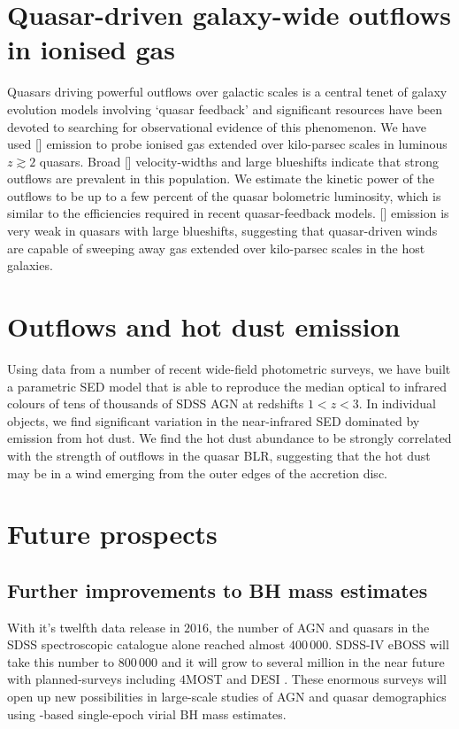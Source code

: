 \section{Quasar-driven galaxy-wide outflows in ionised gas} 

Quasars driving powerful outflows over galactic scales is a central tenet of galaxy evolution models involving `quasar feedback' and significant resources have been devoted to searching for observational evidence of this phenomenon.  
We have used [] emission to probe ionised gas extended over kilo-parsec scales in luminous $z\gtrsim2$ quasars.
Broad [] velocity-widths and large blueshifts indicate that strong outflows are prevalent in this population.  
We estimate the kinetic power of the outflows to be up to a few percent of the quasar bolometric luminosity, which is similar to the efficiencies required in recent quasar-feedback models. 
[] emission is very weak in quasars with large  blueshifts, suggesting that quasar-driven winds are capable of sweeping away gas extended over kilo-parsec scales in the host galaxies. 

\section{Outflows and hot dust emission}

Using data from a number of recent wide-field photometric surveys, we have built a parametric SED model that is able to reproduce the median optical to infrared colours of tens of thousands of SDSS AGN at redshifts $1 < z < 3$. 
In individual objects, we find significant variation in the near-infrared SED dominated by emission from hot dust. 
We find the hot dust abundance to be strongly correlated with the strength of outflows in the quasar BLR, suggesting that the hot dust may be in a wind emerging from the outer edges of the accretion disc. 

\section{Future prospects}

\subsection{Further improvements to BH mass estimates}

With it's twelfth data release in $2016$, the number of AGN and quasars in the SDSS spectroscopic catalogue alone reached almost $400\,000$. 
SDSS-IV eBOSS will take this number to $800\,000$ \citep{myers15} and it will grow to several million in the near future with planned-surveys including $4$MOST and DESI \citep{dejong12,levi13}.
These enormous surveys will open up new possibilities in large-scale studies of AGN and quasar demographics using -based single-epoch virial BH mass estimates.

